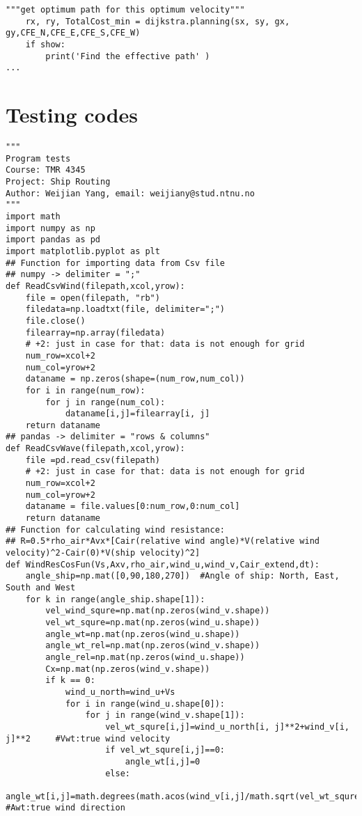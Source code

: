 \begin{lstlisting}[caption=Codes for choosing the optimum speed (\autoref{Effective velocity}), label=ChoOptVel]
    """get optimum path for this optimum velocity"""
    rx, ry, TotalCost_min = dijkstra.planning(sx, sy, gx, gy,CFE_N,CFE_E,CFE_S,CFE_W)
    if show:
        print('Find the effective path' )
...
\end{lstlisting}
\section{Testing codes}
\begin{lstlisting}[caption=Testing codes (\autoref{TestResults}), label=TestCodes]
"""
Program tests
Course: TMR 4345 
Project: Ship Routing
Author: Weijian Yang, email: weijiany@stud.ntnu.no
"""
import math
import numpy as np
import pandas as pd
import matplotlib.pyplot as plt
## Function for importing data from Csv file
## numpy -> delimiter = ";"
def ReadCsvWind(filepath,xcol,yrow):
    file = open(filepath, "rb")
    filedata=np.loadtxt(file, delimiter=";")
    file.close()
    filearray=np.array(filedata)
    # +2: just in case for that: data is not enough for grid
    num_row=xcol+2                  
    num_col=yrow+2
    dataname = np.zeros(shape=(num_row,num_col))
    for i in range(num_row):
        for j in range(num_col):
            dataname[i,j]=filearray[i, j]
    return dataname
## pandas -> delimiter = "rows & columns"
def ReadCsvWave(filepath,xcol,yrow):
    file =pd.read_csv(filepath)
    # +2: just in case for that: data is not enough for grid
    num_row=xcol+2 
    num_col=yrow+2
    dataname = file.values[0:num_row,0:num_col]
    return dataname
## Function for calculating wind resistance:
## R=0.5*rho_air*Avx*[Cair(relative wind angle)*V(relative wind velocity)^2-Cair(0)*V(ship velocity)^2]
def WindResCosFun(Vs,Axv,rho_air,wind_u,wind_v,Cair_extend,dt):
    angle_ship=np.mat([0,90,180,270])  #Angle of ship: North, East, South and West
    for k in range(angle_ship.shape[1]):
        vel_wind_squre=np.mat(np.zeros(wind_v.shape))
        vel_wt_squre=np.mat(np.zeros(wind_u.shape))
        angle_wt=np.mat(np.zeros(wind_u.shape))
        angle_wt_rel=np.mat(np.zeros(wind_v.shape))
        angle_rel=np.mat(np.zeros(wind_u.shape))
        Cx=np.mat(np.zeros(wind_v.shape))
        if k == 0:
            wind_u_north=wind_u+Vs
            for i in range(wind_u.shape[0]):
                for j in range(wind_v.shape[1]):
                    vel_wt_squre[i,j]=wind_u_north[i, j]**2+wind_v[i, j]**2     #Vwt:true wind velocity
                    if vel_wt_squre[i,j]==0:
                        angle_wt[i,j]=0
                    else:
                        angle_wt[i,j]=math.degrees(math.acos(wind_v[i,j]/math.sqrt(vel_wt_squre[i,j]))) #Awt:true wind direction
                    

\end{lstlisting}
